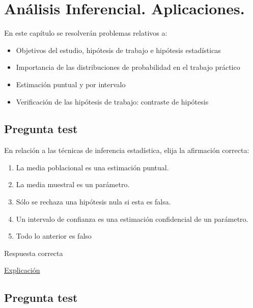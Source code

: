 \documentclass[
]{book}
\providecommand{\tightlist}{%
  \setlength{\itemsep}{0pt}\setlength{\parskip}{0pt}}
\begin{document}
\hypertarget{anuxe1lisis-inferencial.-aplicaciones.}{%
\chapter{Análisis Inferencial. Aplicaciones.}\label{anuxe1lisis-inferencial.-aplicaciones.}}

En este capítulo se resolverán problemas relativos a:

\begin{itemize}
\tightlist
\item
  Objetivos del estudio, hipótesis de trabajo e hipótesis estadísticas
\item
  Importancia de las distribuciones de probabilidad en el trabajo práctico
\item
  Estimación puntual y por intervalo
\item
  Verificación de las hipótesis de trabajo: contraste de hipótesis
\end{itemize}

\hypertarget{pregunta-test-94}{%
\section{Pregunta test}\label{pregunta-test-94}}

En relación a las técnicas de inferencia estadística, elija la afirmación correcta:

\begin{enumerate}
\def\labelenumi{\alph{enumi})}
\tightlist
\item
  La media poblacional es una estimación puntual.
\item
  La media muestral es un parámetro.
\item
  Sólo se rechaza una hipótesis nula si esta es falsa.
\item
  Un intervalo de confianza es una estimación confidencial de un parámetro.
\item
  Todo lo anterior es falso
\end{enumerate}

Respuesta correcta

\href{https://1fjmanzano.github.io/bioestadistica/estimacio\%CC\%81n-de-para\%CC\%81metros.-intervalos-de-confianza.html}{Explicación}

\hypertarget{pregunta-test-95}{%
\section{Pregunta test}\label{pregunta-test-95}}
\end{document}
